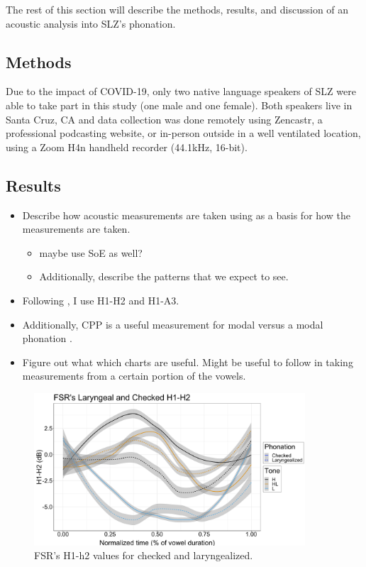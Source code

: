 \documentclass[12pt, letterpaper]{article}
\begin{document}
The rest of this section will describe the methods, results, and discussion of an acoustic analysis into SLZ's phonation. 

\subsection{Methods} \label{sec:Methods}

Due to the impact of COVID-19, only two native language speakers of SLZ were able to take part in this study (one male and one female). Both speakers live in Santa Cruz, CA and data collection was done remotely using Zencastr, a professional podcasting website, or in-person outside in a well ventilated location, using a Zoom H4n handheld recorder (44.1kHz, 16-bit). 

\subsection{Results} \label{sec:Results}

\begin{itemize}
	\item Describe how acoustic measurements are taken using \citet{garellekPhoneticsVoice2019} as a basis for how the measurements are taken. 
	\begin{itemize}
		\item maybe use SoE as well?
		\item Additionally, describe the patterns that we expect to see. 
	\end{itemize}
	\item Following \citet{espositoVariationContrastivePhonation2010}, I use H1-H2 and H1-A3. 
	\item Additionally, CPP is a useful measurement for modal versus a modal phonation \citep{garellekPhoneticsWhiteHmong2021}.
	\item Figure out what which charts are useful. Might be useful to follow \citet{espositoVariationContrastivePhonation2010} in taking measurements from a certain portion of the vowels. 
\end{itemize}

\begin{figure}[!ht]
	\includegraphics[width=0.9\textwidth]{../h1h2_CheckedLaryngeal.png}
	\caption{FSR's H1-h2 values for checked and laryngealized.}
	\label{fig:FSRh1h2checked} 
\end{figure}
\end{document}

